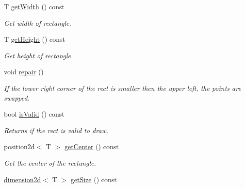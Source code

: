 \begin{DoxyCompactItemize}
\mbox{\label{classirr_1_1core_1_1rect_ad5dcae186b85b938d42b59c91bfeb9a5}} 
T \hyperlink{classirr_1_1core_1_1rect_ad5dcae186b85b938d42b59c91bfeb9a5}{get\+Width} () const
\begin{DoxyCompactList}\small\item\em Get width of rectangle. \end{DoxyCompactList}\item 
\mbox{\label{classirr_1_1core_1_1rect_ad43b325eeb165c553a58f34efb2ee961}} 
T \hyperlink{classirr_1_1core_1_1rect_ad43b325eeb165c553a58f34efb2ee961}{get\+Height} () const
\begin{DoxyCompactList}\small\item\em Get height of rectangle. \end{DoxyCompactList}\item 
\mbox{\label{classirr_1_1core_1_1rect_a45c7665e74aed626bb5c01729f206775}} 
void \hyperlink{classirr_1_1core_1_1rect_a45c7665e74aed626bb5c01729f206775}{repair} ()
\begin{DoxyCompactList}\small\item\em If the lower right corner of the rect is smaller then the upper left, the points are swapped. \end{DoxyCompactList}\item 
bool \hyperlink{classirr_1_1core_1_1rect_ad2f5052c13cffb08f6ce8649296ec9df}{is\+Valid} () const
\begin{DoxyCompactList}\small\item\em Returns if the rect is valid to draw. \end{DoxyCompactList}\item 
\mbox{\label{classirr_1_1core_1_1rect_adf7b75a834fde75f5932f2a89a3d75cd}} 
position2d$<$ T $>$ \hyperlink{classirr_1_1core_1_1rect_adf7b75a834fde75f5932f2a89a3d75cd}{get\+Center} () const
\begin{DoxyCompactList}\small\item\em Get the center of the rectangle. \end{DoxyCompactList}\item 
\mbox{\label{classirr_1_1core_1_1rect_aa5e0bf0e6474c1603c735a63843833fa}} 
\hyperlink{classirr_1_1core_1_1dimension2d}{dimension2d}$<$ T $>$ \hyperlink{classirr_1_1core_1_1rect_aa5e0bf0e6474c1603c735a63843833fa}{get\+Size} () const

\end{DoxyCompactItemize}
